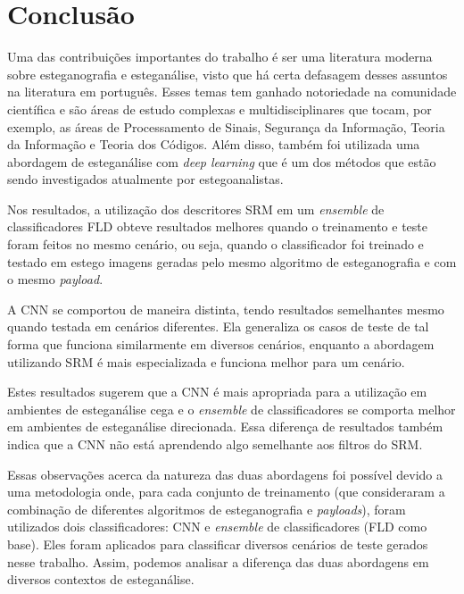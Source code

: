 
\chapter{Conclusão}
\label{chap:conclusao}

Uma das contribuições importantes do trabalho é ser uma literatura moderna sobre esteganografia e esteganálise, visto que há certa defasagem desses assuntos na literatura em português. Esses temas tem ganhado notoriedade na comunidade científica e são áreas de estudo complexas e multidisciplinares que tocam, por exemplo, as áreas de Processamento de Sinais, Segurança da Informação, Teoria da Informação e Teoria dos Códigos. Além disso, também foi utilizada uma abordagem de esteganálise com \textit{deep learning} que é um dos métodos que estão sendo investigados atualmente por estegoanalistas.

Nos resultados, a utilização dos descritores SRM em	 um \textit{ensemble} de classificadores FLD obteve resultados melhores quando o treinamento e teste foram feitos no mesmo cenário, ou seja, quando o classificador foi treinado e testado em estego imagens geradas pelo mesmo algoritmo de esteganografia e com o mesmo \textit{payload}. 

A CNN se comportou de maneira distinta, tendo resultados semelhantes mesmo quando testada em cenários diferentes. Ela generaliza os casos de teste de tal forma que funciona similarmente em diversos cenários, enquanto a abordagem utilizando SRM é mais especializada e funciona melhor para um cenário. 

Estes resultados sugerem que a CNN é mais apropriada para a utilização em ambientes de esteganálise cega e o \textit{ensemble} de classificadores se comporta  melhor em ambientes de esteganálise direcionada. Essa diferença de resultados também indica que a CNN não está aprendendo algo semelhante aos filtros do SRM.

Essas observações acerca da natureza das duas abordagens foi possível devido a uma metodologia onde, para cada conjunto de treinamento (que consideraram a combinação de diferentes algoritmos de esteganografia e \textit{payloads}), foram utilizados dois classificadores: CNN e \textit{ensemble} de classificadores (FLD como base). Eles foram aplicados para classificar diversos cenários de teste gerados nesse trabalho. Assim, podemos analisar a diferença das duas abordagens em diversos contextos de esteganálise.

